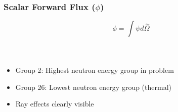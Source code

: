 \documentclass[t]{beamer}
\begin{document}
\begin{frame}
  \frametitle{Scalar Forward Flux ($\phi$)}
  \vskip-0.25in
  \begin{equation}
    \phi = \int\psi d\hat{\Omega}
  \end{equation}
  \vskip-0.25in
  \begin{columns}
    \begin{figure}
    \end{figure}
    \begin{figure}
    \end{figure}
  \end{columns}
  \begin{itemize}
    \item Group 2: Highest neutron energy group in problem
    \item Group 26: Lowest neutron energy group (thermal)
    \item Ray effects clearly visible
  \end{itemize}
\end{frame}
\end{document}
